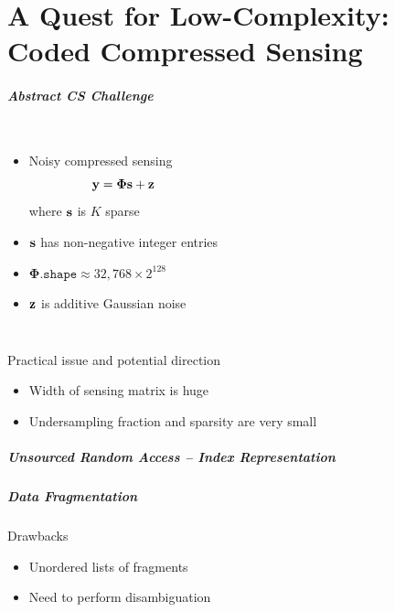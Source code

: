 \part{A Quest for Low-Complexity: \newline Coded Compressed Sensing}
\frame{\partpage}


\begin{frame}
\frametitle{Abstract CS Challenge}
\begin{columns}
  \begin{itemize}
  \item Noisy compressed sensing
  \begin{equation*}
  \mathbf{y} = \boldsymbol{\Phi} \mathbf{s} + \mathbf{z}
  \end{equation*}
  where $\mathbf{s}$ is $K$ sparse
  \item $\mathbf{s}$ has non-negative integer entries
  \item $\boldsymbol{\Phi}.\mathtt{shape} \approx 32,768 \times 2^{128}$
  \item $\mathbf{z}$ is additive Gaussian noise
  \end{itemize}
  \hspace{-1cm} \scalebox{0.75}{}
\end{columns}
\vfill
\begin{exampleblock}{Practical issue and potential direction}
  \begin{itemize}
  \item Width of sensing matrix is huge
  \item Undersampling fraction and sparsity are very small
  \end{itemize}
\end{exampleblock}
\end{frame}


\begin{frame} \frametitle{Unsourced Random Access -- Index Representation}
\begin{center}  \end{center}
\end{frame}


\begin{frame}
\frametitle{Data Fragmentation}
\begin{center}

\end{center}
\begin{alertblock}{Drawbacks}
  \begin{itemize}
  \item Unordered lists of fragments
  \item Need to perform disambiguation
  \end{itemize}
\end{alertblock}
\end{frame}

